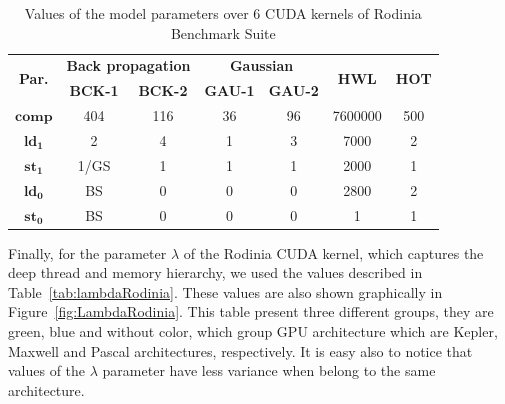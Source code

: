 \begin{table}[htpb]
\centering

\begin{tabular}{| c | c | c  |  c | c | c | c |} 
\midrule
\multirow{2}{*}{\textbf{Par.}} & \multicolumn{2}{c|}{\textbf{Back propagation}}&\multicolumn{2}{c|}{\textbf{Gaussian}}&\multirow{2}{*}{\textbf{HWL}}&\multirow{2}{*}{\textbf{HOT}}
\\\cline{2-5}& \textbf{BCK-1} & \textbf{BCK-2} & \textbf{GAU-1} & \textbf{GAU-2} & &   \\\midrule
$\mathbf{comp}$&404&116&36&96&7600000&500 \\\midrule
$\mathbf{ld_1}$&2&4&1&3&7000&2\\\midrule
$\mathbf{st_1}$&1/GS&1&1&1&2000&1\\\midrule
$\mathbf{ld_0}$&BS&0&0&0&2800&2\\\midrule
$\mathbf{st_0}$&BS&0&0&0&1&1\\
\midrule
\end{tabular}
\caption{Values of the model parameters over 6 CUDA kernels of Rodinia Benchmark Suite}
\label{tab:Par-Rodinia} %
\end{table}

Finally, for the parameter $\lambda$ of the Rodinia CUDA kernel, which captures the deep thread and memory hierarchy, we used the values described in Table~\ref{tab:lambdaRodinia}. These values are also shown graphically in Figure~\ref{fig:LambdaRodinia}. This table present three different groups, they are green, blue and without color, which group GPU architecture which are Kepler, Maxwell and Pascal architectures, respectively. It is easy also to notice that values of the $\lambda$ parameter have less variance when belong to the same architecture.



